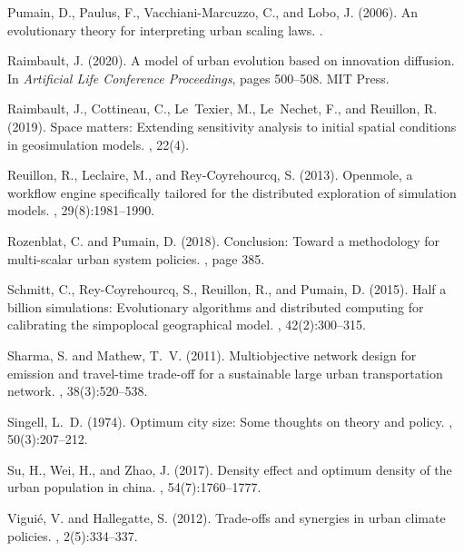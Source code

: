 \documentclass{article}
\begin{document}
\begin{thebibliography}{}
Pumain, D., Paulus, F., Vacchiani-Marcuzzo, C., and Lobo, J. (2006).
\newblock An evolutionary theory for interpreting urban scaling laws.
.

Raimbault, J. (2020).
\newblock A model of urban evolution based on innovation diffusion.
\newblock In {\em Artificial Life Conference Proceedings}, pages 500--508. MIT
  Press.

Raimbault, J., Cottineau, C., Le~Texier, M., Le~Nechet, F., and Reuillon, R.
  (2019).
\newblock Space matters: Extending sensitivity analysis to initial spatial
  conditions in geosimulation models.
, 22(4).

Reuillon, R., Leclaire, M., and Rey-Coyrehourcq, S. (2013).
\newblock Openmole, a workflow engine specifically tailored for the distributed
  exploration of simulation models.
, 29(8):1981--1990.

Rozenblat, C. and Pumain, D. (2018).
\newblock Conclusion: Toward a methodology for multi-scalar urban system
  policies.
,
  page 385.

Schmitt, C., Rey-Coyrehourcq, S., Reuillon, R., and Pumain, D. (2015).
\newblock Half a billion simulations: Evolutionary algorithms and distributed
  computing for calibrating the simpoplocal geographical model.
,
  42(2):300--315.

Sharma, S. and Mathew, T.~V. (2011).
\newblock Multiobjective network design for emission and travel-time trade-off
  for a sustainable large urban transportation network.
,
  38(3):520--538.

Singell, L.~D. (1974).
\newblock Optimum city size: Some thoughts on theory and policy.
, 50(3):207--212.

Su, H., Wei, H., and Zhao, J. (2017).
\newblock Density effect and optimum density of the urban population in china.
, 54(7):1760--1777.

Vigui{\'e}, V. and Hallegatte, S. (2012).
\newblock Trade-offs and synergies in urban climate policies.
, 2(5):334--337.

\end{thebibliography}
\end{document}
